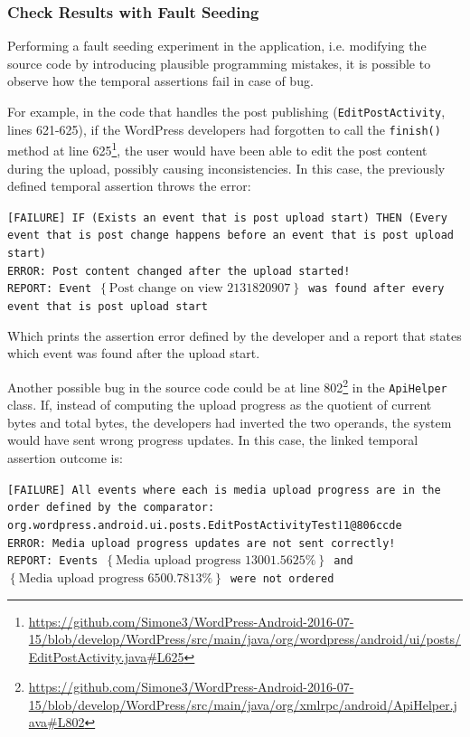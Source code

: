\documentclass[11pt,a4paper,notitlepage]{article}
\begin{document}
\subsubsection{Check Results with Fault Seeding}
Performing a fault seeding experiment in the application, i.e. modifying the source code by introducing plausible programming mistakes, it is possible to observe how the temporal assertions fail in case of bug.

For example, in the code that handles the post publishing (\texttt{EditPostActivity}, lines 621-625), if the WordPress developers had forgotten to call the \texttt{finish()} method at line 625\footnote{\url{https://github.com/Simone3/WordPress-Android-2016-07-15/blob/develop/WordPress/src/main/java/org/wordpress/android/ui/posts/EditPostActivity.java\#L625}}, the user would have been able to edit the post content during the upload, possibly causing inconsistencies. In this case, the previously defined temporal assertion throws the error:

\texttt{[FAILURE] IF (Exists an event that is post upload start) THEN (Every event that is post change happens before an event that is post upload start)\\
	ERROR: Post content changed after the upload started!\\
	REPORT: Event $\left\{\text{Post change on view 2131820907}\right\}$ was found after every event that is post upload start}
	
Which prints the assertion error defined by the developer and a report that states which event was found after the upload start.


Another possible bug in the source code could be at line 802\footnote{\url{https://github.com/Simone3/WordPress-Android-2016-07-15/blob/develop/WordPress/src/main/java/org/xmlrpc/android/ApiHelper.java\#L802}} in the \texttt{ApiHelper} class. If, instead of computing the upload progress as the quotient of current bytes and total bytes, the developers had inverted the two operands, the system would have sent wrong progress updates. In this case, the linked temporal assertion outcome is:

\texttt{[FAILURE] All events where each is media upload progress are in the order defined by the comparator: org.wordpress.android.ui.posts.EditPostActivityTest$1$1@806ccde\\
	ERROR: Media upload progress updates are not sent correctly!\\
	REPORT: Events $\left\{\text{Media upload progress 13001.5625\%}\right\}$ and $\left\{\text{Media upload progress 6500.7813\%}\right\}$ were not ordered}
	
\end{document}
